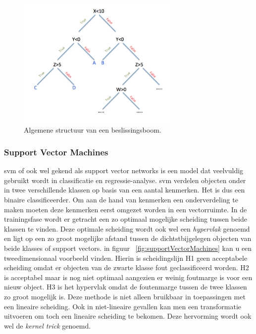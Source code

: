 		\begin{figure}
			\centering
			\includegraphics[width=80mm]{afbeeldingen/beslissingsBoom.PNG}
			\caption{Algemene structuur van een beslissingsboom.\citep{bron:beslissingsboom}}
			\label{fig:beslissingsBoom}
		\end{figure}
		
		
	
	
	\subsubsection{Support Vector Machines}
	\gls{svm} of ook wel gekend als support vector networks is een model dat veelvuldig gebruikt wordt in classificatie en regressie-analyse. \gls{svm} verdelen objecten onder in twee verschillende klassen op basis van een aantal kenmerken. Het is dus een binaire classificeerder. Om aan de hand van kenmerken een onderverdeling te maken moeten deze kenmerken eerst omgezet worden in een vectorruimte. In de trainingsfase wordt er getracht een zo optimaal mogelijke scheiding tussen beide klassen te vinden. Deze optimale scheiding wordt ook wel een \textit{hypervlak} genoemd en ligt op een zo groot mogelijke afstand tussen de dichtstbijgelegen objecten van beide klasses of support vectors. in figuur ~\ref{fig:supportVectorMachines} kan u een tweedimensionaal voorbeeld vinden. Hierin is scheidingslijn H1 geen acceptabele scheiding omdat er objecten van de zwarte klasse fout geclassificeerd worden. H2 is acceptabel maar is nog niet optimaal aangezien er weinig foutmarge is voor een nieuw object. H3 is het hypervlak omdat de foutenmarge tussen de twee klassen zo groot mogelijk is. Deze methode is niet alleen bruikbaar in toepassingen met een lineaire scheiding. Ook in niet-lineaire gevallen kan men een transformatie uitvoeren om toch een lineaire scheiding te bekomen. Deze hervorming wordt ook wel de \textit{kernel trick}\cite{sun2018kernel} genoemd. 
	
